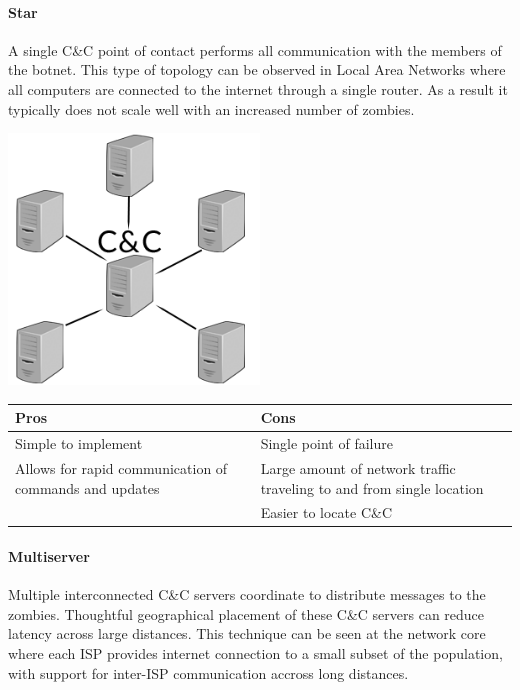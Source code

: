 \paragraph{Star \cite{topology}}
A single C\&C point of contact performs all communication with the members
of the botnet. This type of topology can be observed in Local Area Networks
where all computers are connected to the internet through a single router. As a
result it typically does not scale well with an increased number of zombies.

\begin{center}
  \includegraphics[width=0.5\textwidth]{assets/startopo.png}
  \label{fig:star_topo_fig}
\end{center}

\begin{tabular}{p{8cm} | p{8cm}}
  \textbf{Pros} & \textbf{Cons} \\ \hline
  \textbullet{}Simple to implement                                    & \textbullet{}Single point of failure \\
  \textbullet{}Allows for rapid communication of commands and updates & \textbullet{}Large amount of network traffic traveling to and from single location\\
                                                                      & \textbullet{}Easier to locate C\&C
\end{tabular}

\paragraph{Multiserver \cite{topology}}
Multiple interconnected C\&C servers coordinate to distribute messages to the zombies.
Thoughtful geographical placement of these C\&C servers can reduce latency across
large distances.  This technique can be seen at the network core where each
ISP provides internet connection to a small subset of the population, with support for
inter-ISP communication accross long distances.

